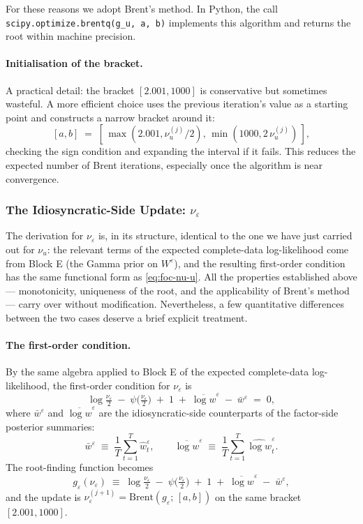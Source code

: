 \documentclass[11pt, a4paper, oneside]{article}
\begin{document}
For these reasons we adopt Brent's method. In Python, the call
\texttt{scipy.optimize.brentq(g\_u, a, b)} implements this
algorithm and returns the root within machine precision.

\paragraph{Initialisation of the bracket.}
A practical detail: the bracket $[2.001, 1000]$ is conservative but
sometimes wasteful. A more efficient choice uses the previous iteration's
value as a starting point and constructs a narrow bracket around it:
\[
[a, b] \;=\; [\,\max(2.001, \nu_u^{(j)}/2),\, \min(1000, 2\,\nu_u^{(j)})\,],
\]
checking the sign condition and expanding the interval if it fails.
This reduces the expected number of Brent iterations, especially once
the algorithm is near convergence.


\subsubsection{The Idiosyncratic-Side Update: $\nu_\varepsilon$}

The derivation for $\nu_\varepsilon$ is, in its structure, identical to
the one we have just carried out for $\nu_u$: the relevant terms of the
expected complete-data log-likelihood come from Block E (the Gamma
prior on $W^\varepsilon$), and the resulting first-order condition has
the same functional form as \eqref{eq:foc-nu-u}. All the properties
established above — monotonicity, uniqueness of the root, and the
applicability of Brent's method — carry over without modification.
Nevertheless, a few quantitative differences between the two cases
deserve a brief explicit treatment.

\paragraph{The first-order condition.}
By the same algebra applied to Block E of the expected complete-data
log-likelihood, the first-order condition for $\nu_\varepsilon$ is
\begin{equation}
\log\!\tfrac{\nu_\varepsilon}{2} \;-\; \psi\!\big(\tfrac{\nu_\varepsilon}{2}\big) \;+\; 1 \;+\; \overline{\log w}^\varepsilon \;-\; \bar{w}^\varepsilon \;=\; 0,
\label{eq:foc-nu-eps-summary}
\end{equation}
where $\bar{w}^\varepsilon$ and $\overline{\log w}^\varepsilon$ are the
idiosyncratic-side counterparts of the factor-side posterior summaries:
\[
\bar{w}^\varepsilon \;\equiv\; \frac{1}{T}\sum_{t=1}^T \hat{w}^\varepsilon_t,
\qquad
\overline{\log w}^\varepsilon \;\equiv\; \frac{1}{T}\sum_{t=1}^T \widehat{\log w}^\varepsilon_t.
\]
The root-finding function becomes
\[
g_\varepsilon(\nu_\varepsilon) \;\equiv\; \log\!\tfrac{\nu_\varepsilon}{2} \;-\; \psi\!\big(\tfrac{\nu_\varepsilon}{2}\big) \;+\; 1 \;+\; \overline{\log w}^\varepsilon \;-\; \bar{w}^\varepsilon,
\]
and the update is $\nu_\varepsilon^{(j+1)} = \mathrm{Brent}(g_\varepsilon;\, [a, b])$ on the same
bracket $[2.001, 1000]$.
\end{document}
